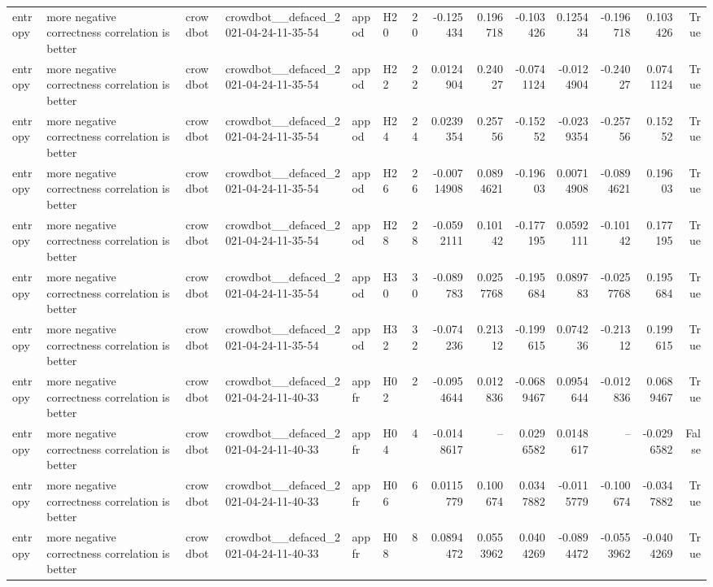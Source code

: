 \begin{longtable}{llllllrrrrrrrr}
entropy & more negative correctness correlation is better & crowdbot & crowdbot\_\_defaced\_2021-04-24-11-35-54 & appod & H20 & 20 & -0.125434 & 0.196718 & -0.103426 & 0.125434 & -0.196718 & 0.103426 & True \\
entropy & more negative correctness correlation is better & crowdbot & crowdbot\_\_defaced\_2021-04-24-11-35-54 & appod & H22 & 22 & 0.0124904 & 0.24027 & -0.0741124 & -0.0124904 & -0.24027 & 0.0741124 & True \\
entropy & more negative correctness correlation is better & crowdbot & crowdbot\_\_defaced\_2021-04-24-11-35-54 & appod & H24 & 24 & 0.0239354 & 0.25756 & -0.15252 & -0.0239354 & -0.25756 & 0.15252 & True \\
entropy & more negative correctness correlation is better & crowdbot & crowdbot\_\_defaced\_2021-04-24-11-35-54 & appod & H26 & 26 & -0.00714908 & 0.0894621 & -0.19603 & 0.00714908 & -0.0894621 & 0.19603 & True \\
entropy & more negative correctness correlation is better & crowdbot & crowdbot\_\_defaced\_2021-04-24-11-35-54 & appod & H28 & 28 & -0.0592111 & 0.10142 & -0.177195 & 0.0592111 & -0.10142 & 0.177195 & True \\
entropy & more negative correctness correlation is better & crowdbot & crowdbot\_\_defaced\_2021-04-24-11-35-54 & appod & H30 & 30 & -0.089783 & 0.0257768 & -0.195684 & 0.089783 & -0.0257768 & 0.195684 & True \\
entropy & more negative correctness correlation is better & crowdbot & crowdbot\_\_defaced\_2021-04-24-11-35-54 & appod & H32 & 32 & -0.074236 & 0.21312 & -0.199615 & 0.074236 & -0.21312 & 0.199615 & True \\
entropy & more negative correctness correlation is better & crowdbot & crowdbot\_\_defaced\_2021-04-24-11-40-33 & appfr & H02 & 2 & -0.0954644 & 0.012836 & -0.0689467 & 0.0954644 & -0.012836 & 0.0689467 & True \\
entropy & more negative correctness correlation is better & crowdbot & crowdbot\_\_defaced\_2021-04-24-11-40-33 & appfr & H04 & 4 & -0.0148617 & -- & 0.0296582 & 0.0148617 & -- & -0.0296582 & False \\
entropy & more negative correctness correlation is better & crowdbot & crowdbot\_\_defaced\_2021-04-24-11-40-33 & appfr & H06 & 6 & 0.0115779 & 0.100674 & 0.0347882 & -0.0115779 & -0.100674 & -0.0347882 & True \\
entropy & more negative correctness correlation is better & crowdbot & crowdbot\_\_defaced\_2021-04-24-11-40-33 & appfr & H08 & 8 & 0.0894472 & 0.0553962 & 0.0404269 & -0.0894472 & -0.0553962 & -0.0404269 & True \\

\end{longtable}
